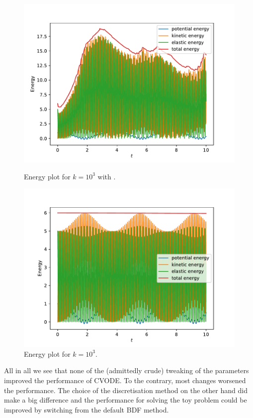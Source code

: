 \documentclass{scrartcl}
\begin{document}
\begin{figure}[h]
\centering
\begin{minipage}[b]{0.45\textwidth}
\centering
\includegraphics[width=\textwidth]{../Plots/Task4/Figure_450}
\caption{Energy plot for $k=10^3$ with .}
\label{pl:energy2}
\end{minipage}
\hfill
\begin{minipage}[b]{0.45\textwidth}
\centering
\includegraphics[width=\textwidth]{../Plots/Task4/Figure_451}
\caption{Energy plot for $k=10^3$.}
\label{pl:energy3}
\end{minipage}
\end{figure}

All in all we see that none of the (admittedly crude) tweaking of the parameters improved the performance of CVODE. To the contrary, most changes worsened the performance. The choice of the discretisation method on the other hand did make a big difference and the performance for solving the toy problem could be improved by switching from the default BDF method.
\end{document}
